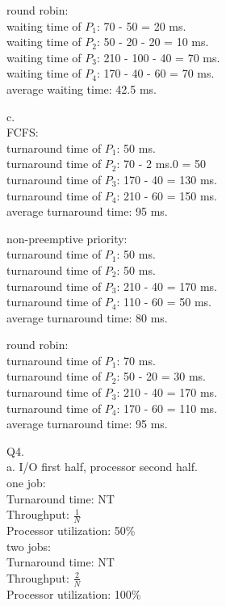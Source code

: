 \documentclass[a4paper, tikz, border=10pt]{article}
\begin{document}
round robin:\\
waiting time of $P_{1}$: 70 - 50 = 20 ms.\\
waiting time of $P_{2}$: 50 - 20 - 20 = 10 ms.\\
waiting time of $P_{3}$: 210 - 100 - 40 = 70 ms.\\
waiting time of $P_{4}$: 170 - 40 - 60 = 70 ms.\\
average waiting time: 42.5 ms.

c.\\
FCFS:\\
turnaround time of $P_{1}$: 50 ms.\\
turnaround time of $P_{2}$: 70 - 2 ms.0 = 50\\
turnaround time of $P_{3}$: 170 - 40 = 130 ms.\\
turnaround time of $P_{4}$: 210 - 60 = 150 ms.\\
average turnaround time: 95 ms.

non-preemptive priority:\\
turnaround time of $P_{1}$: 50 ms.\\
turnaround time of $P_{2}$: 50 ms.\\
turnaround time of $P_{3}$: 210 - 40 = 170 ms.\\
turnaround time of $P_{4}$: 110 - 60 = 50 ms.\\
average turnaround time: 80 ms.

round robin:\\
turnaround time of $P_{1}$: 70 ms.\\
turnaround time of $P_{2}$: 50 - 20 = 30 ms.\\
turnaround time of $P_{3}$: 210 - 40 = 170 ms.\\
turnaround time of $P_{4}$: 170 - 60 = 110 ms.\\
average turnaround time: 95 ms.

Q4.\\
a. I/O first half, processor second half. \\
one job:\\
Turnaround time: NT\\
Throughput: $\frac{1}{N}$\\
Processor utilization: 50\%\\

two jobs:\\
Turnaround time: NT\\
Throughput: $\frac{2}{N}$\\
Processor utilization: 100\%\\
\end{document}
